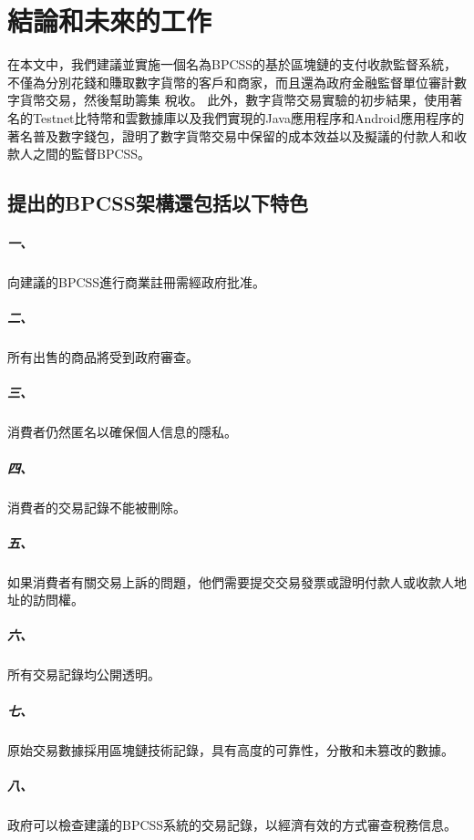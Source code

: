 
\chapter{結論和未來的工作}
在本文中，我們建議並實施一個名為BPCSS的基於區塊鏈的支付收款監督系統，不僅為分別花錢和賺取數字貨幣的客戶和商家，而且還為政府金融監督單位審計數字貨幣交易，然後幫助籌集 稅收。 此外，數字貨幣交易實驗的初步結果，使用著名的Testnet比特幣和雲數據庫以及我們實現的Java應用程序和Android應用程序的著名普及數字錢包，證明了數字貨幣交易中保留的成本效益以及擬議的付款人和收款人之間的監督BPCSS。
	
	\section{提出的BPCSS架構還包括以下特色}

		\paragraph{一、}向建議的BPCSS進行商業註冊需經政府批准。
		\paragraph{二、}所有出售的商品將受到政府審查。
		\paragraph{三、}消費者仍然匿名以確保個人信息的隱私。
		\paragraph{四、}消費者的交易記錄不能被刪除。
		\paragraph{五、}如果消費者有關交易上訴的問題，他們需要提交交易發票或證明付款人或收款人地址的訪問權。
		\paragraph{六、}所有交易記錄均公開透明。
		\paragraph{七、}原始交易數據採用區塊鏈技術記錄，具有高度的可靠性，分散和未篡改的數據。
		\paragraph{八、}政府可以檢查建議的BPCSS系統的交易記錄，以經濟有效的方式審查稅務信息。

